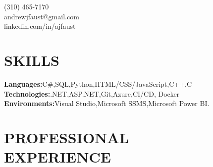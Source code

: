 \documentclass[margin,line,11pt]{resume}
\begin{document}
{
	\sc
    \hfill (310) 465-7170           \vspace{0mm}\\\vspace{0mm}%
    \hfill andrewjfaust@gmail.com   \vspace{0mm}\\\vspace{0mm}%
    \hfill linkedin.com/in/ajfaust  \vspace{0mm}\\\vspace{0mm}%
}

\begin{resume}

\vspace{1mm}

    \section{\mysidestyle \textbf{\large{S}\small{KILLS}}}

    \textbf{Languages:}\hspace{2mm}C\#,\hspace{2mm}SQL,\hspace{2mm}Python,\hspace{2mm}HTML/CSS/JavaScript,\hspace{2mm}C++,\hspace{2mm}C\\
    \textbf{Technologies:}\hspace{2mm}.NET,\hspace{2mm}ASP.NET,\hspace{2mm}Git,\hspace{2mm}Azure,\hspace{2mm}CI/CD, Docker\\
    \textbf{Environments:}\hspace{2mm}Visual Studio,\hspace{2mm}Microsoft SSMS,\hspace{2mm}Microsoft Power BI.
\sectionline

    \section{\mysidestyle \textbf{\large{P}\small{ROFESSIONAL\\EXPERIENCE}}}


\end{resume}
\end{document}
